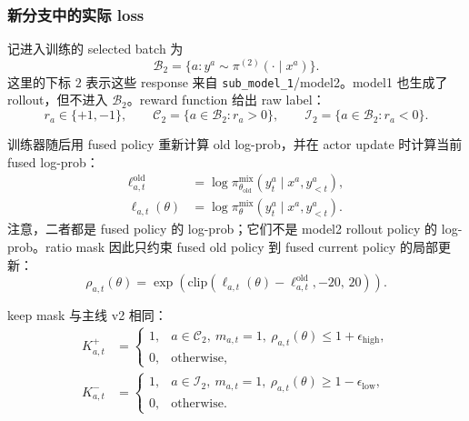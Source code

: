 \subsubsection{新分支中的实际 loss}
\label{app:dual_rollout_loss}

记进入训练的 selected batch 为
\begin{equation}
    \mathcal{B}_2=\{a:y^a\sim\pi^{(2)}(\cdot\mid x^a)\}.
\end{equation}
这里的下标 $2$ 表示这些 response 来自 \texttt{sub\_model\_1}/model2。model1 也生成了 rollout，但不进入 $\mathcal{B}_2$。reward function 给出 raw label：
\begin{equation}
    r_a\in\{+1,-1\},
    \qquad
    \mathcal{C}_2=\{a\in\mathcal{B}_2:r_a>0\},
    \qquad
    \mathcal{I}_2=\{a\in\mathcal{B}_2:r_a<0\}.
\end{equation}

训练器随后用 fused policy 重新计算 old log-prob，并在 actor update 时计算当前 fused log-prob：
\begin{align}
    \ell^{\mathrm{old}}_{a,t}
        &=
        \log \pi^{\mathrm{mix}}_{\theta_{\mathrm{old}}}
        (y^a_t\mid x^a,y^a_{<t}),\\
    \ell_{a,t}(\theta)
        &=
        \log \pi^{\mathrm{mix}}_{\theta}
        (y^a_t\mid x^a,y^a_{<t}).
\end{align}
注意，二者都是 fused policy 的 log-prob；它们不是 model2 rollout policy 的 log-prob。ratio mask 因此只约束 fused old policy 到 fused current policy 的局部更新：
\begin{equation}
    \rho_{a,t}(\theta)
    =
    \exp\!\left(
        \mathrm{clip}
        \left(
            \ell_{a,t}(\theta)-\ell^{\mathrm{old}}_{a,t},
            -20,\,
            20
        \right)
    \right).
\end{equation}

keep mask 与主线 v2 相同：
\begin{align}
    K^+_{a,t}
    &=
    \begin{cases}
        1,
        & a\in\mathcal{C}_2,\ m_{a,t}=1,\ \rho_{a,t}(\theta)\le 1+\epsilon_{\mathrm{high}},\\
        0,
        & \text{otherwise},
    \end{cases}\\
    K^-_{a,t}
    &=
    \begin{cases}
        1,
        & a\in\mathcal{I}_2,\ m_{a,t}=1,\ \rho_{a,t}(\theta)\ge 1-\epsilon_{\mathrm{low}},\\
        0,
        & \text{otherwise}.
    \end{cases}
\end{align}

